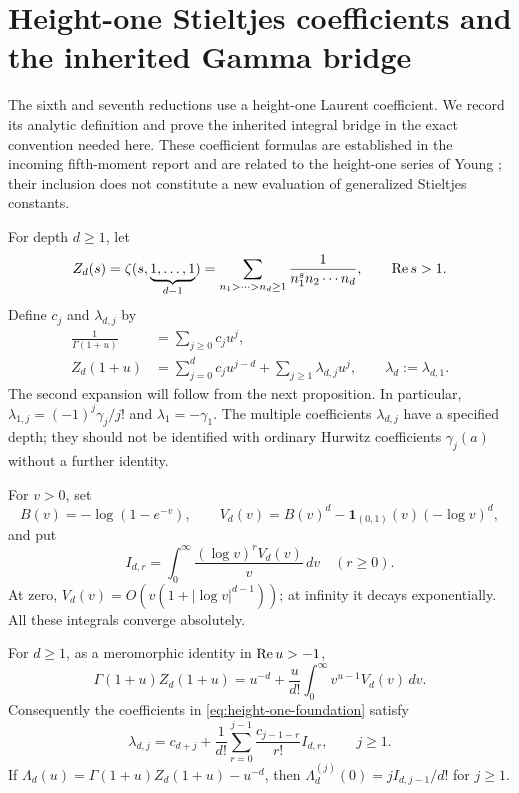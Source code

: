 \section{Height-one Stieltjes coefficients and the inherited Gamma bridge}
\label{sec:gamma-foundation}

The sixth and seventh reductions use a height-one Laurent coefficient.
We record its analytic definition and prove the inherited integral bridge
in the exact convention needed here. These coefficient formulas are
established in the incoming fifth-moment report and are related to the
height-one series of Young \cite{CanonicalFifth,Young2024}; their inclusion
does not constitute a new evaluation of generalized Stieltjes constants.

For depth $d\ge1$, let
\[
 Z_d(s)=\zeta(s,\underbrace{1,\ldots,1}_{d-1})
       =\sum_{n_1>\cdots>n_d\ge1}
          \frac{1}{n_1^s n_2\cdots n_d},\qquad \operatorname{Re} s>1.
\]
Define $c_j$ and $\lambda_{d,j}$ by
\begin{align}
 \frac1{\Gamma(1+u)}&=\sum_{j\ge0}c_ju^j,\label{eq:gamma-c-foundation}\\
 Z_d(1+u)&=\sum_{j=0}^d c_ju^{j-d}
                    +\sum_{j\ge1}\lambda_{d,j}u^j,
 \qquad \lambda_d:=\lambda_{d,1}.
 \label{eq:height-one-foundation}
\end{align}
The second expansion will follow from the next proposition. In particular,
$\lambda_{1,j}=(-1)^j\gamma_j/j!$ and $\lambda_1=-\gamma_1$.
The multiple coefficients $\lambda_{d,j}$ have a specified depth; they
should not be identified with ordinary Hurwitz coefficients $\gamma_j(a)$
without a further identity.

For $v>0$, set
\[
 B(v)=-\log(1-e^{-v}),\qquad
 V_d(v)=B(v)^d-\boldsymbol1_{(0,1)}(v)(-\log v)^d,
\]
and put
\[
 I_{d,r}=\int_0^\infty\frac{(\log v)^rV_d(v)}v\,dv
 \quad(r\ge0).
\]
At zero, $V_d(v)=O(v(1+|\log v|^{d-1}))$; at infinity it
decays exponentially. All these integrals converge absolutely.

\begin{proposition}
\label{prop:height-one-foundation}
For $d\ge1$, as a meromorphic identity in $\operatorname{Re} u>-1$,
\begin{equation}\label{eq:height-one-Mellin-foundation}
 \Gamma(1+u)Z_d(1+u)
 =u^{-d}+\frac{u}{d!}
          \int_0^\infty v^{u-1}V_d(v)\,dv.
\end{equation}
Consequently the coefficients in \eqref{eq:height-one-foundation} satisfy
\begin{equation}\label{eq:height-one-allcoeff-foundation}
 \lambda_{d,j}=c_{d+j}
       +\frac1{d!}\sum_{r=0}^{j-1}
                     \frac{c_{j-1-r}}{r!}I_{d,r},\qquad j\ge1.
\end{equation}
If $\Lambda_d(u)=\Gamma(1+u)Z_d(1+u)-u^{-d}$, then
$\Lambda_d^{(j)}(0)=jI_{d,j-1}/d!$ for $j\ge1$.
\end{proposition}

